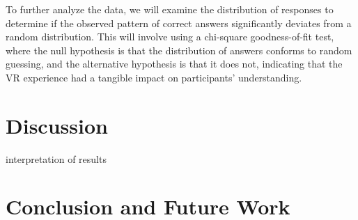 \documentclass[draft, final]{vutinfth} %
\begin{document}
To further analyze the data, we will examine the distribution of responses to determine if the observed pattern of correct answers significantly deviates from a random distribution. This will involve using a chi-square goodness-of-fit test, where the null hypothesis is that the distribution of answers conforms to random guessing, and the alternative hypothesis is that it does not, indicating that the VR experience had a tangible impact on participants' understanding.


\chapter{Discussion}
interpretation of results

\chapter{Conclusion and Future Work}

\backmatter

\listoffigures %



\printindex

\printglossaries


% 

\end{document}
